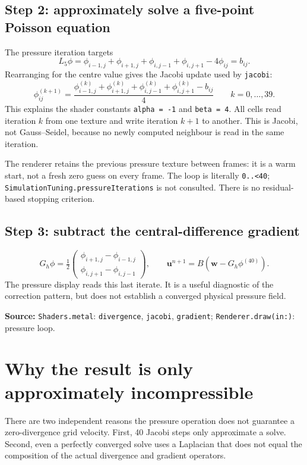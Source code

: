 \documentclass[11pt,a4paper]{article}
\newcommand{\uvec}{\mathbf{u}}
\newcommand{\src}[1]{\par{\footnotesize\raggedright\color{teal}\textbf{Source:} #1\par}}
\newcommand{\code}[1]{\texttt{#1}}
\newcommand{\page}[1]{\clearpage\section{#1}}
\begin{document}
\subsection*{Step 2: approximately solve a five-point Poisson equation}
The pressure iteration targets
\begin{equation}
 L_5\phi=\phi_{i-1,j}+\phi_{i+1,j}+\phi_{i,j-1}+\phi_{i,j+1}
 -4\phi_{ij}=b_{ij}.
\end{equation}
Rearranging for the centre value gives the Jacobi update used by \code{jacobi}:
\begin{equation}
 \boxed{\displaystyle
 \phi_{ij}^{(k+1)}=\frac{\phi_{i-1,j}^{(k)}+\phi_{i+1,j}^{(k)}
 +\phi_{i,j-1}^{(k)}+\phi_{i,j+1}^{(k)}-b_{ij}}{4}}
 \qquad k=0,\ldots,39.\label{eq:jacobi}
\end{equation}
This explains the shader constants \code{alpha = -1} and \code{beta = 4}.
All cells read iteration $k$ from one texture and write iteration $k+1$ to
another. This is Jacobi, not Gauss--Seidel, because no newly computed neighbour
is read in the same iteration.

The renderer retains the previous pressure texture between frames: it is a warm
start, not a fresh zero guess on every frame. The loop is literally
\code{0..<40}; \code{SimulationTuning.pressureIterations} is not consulted.
There is no residual-based stopping criterion.

\subsection*{Step 3: subtract the central-difference gradient}
\begin{equation}
 G_h\phi=\tfrac12
 \begin{pmatrix}\phi_{i+1,j}-\phi_{i-1,j}\\
                 \phi_{i,j+1}-\phi_{i,j-1}\end{pmatrix},\qquad
 \uvec^{n+1}=B\left(\mathbf w-G_h\phi^{(40)}\right).
 \label{eq:gradient}
\end{equation}
The pressure display reads this last iterate. It is a useful diagnostic of the
correction pattern, but does not establish a converged physical pressure field.
\src{\code{Shaders.metal}: \code{divergence}, \code{jacobi}, \code{gradient};
\code{Renderer.draw(in:)}: pressure loop.}

\page{Why the result is only approximately incompressible}
There are two independent reasons the pressure operation does not guarantee a
zero-divergence grid velocity. First, 40 Jacobi steps only approximate a solve.
Second, even a perfectly converged solve uses a Laplacian that does not equal
the composition of the actual divergence and gradient operators.
\end{document}
